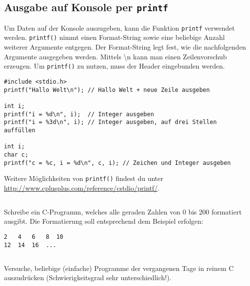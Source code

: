 \subsection{Ausgabe auf Konsole per \lstinline{printf}}

Um Daten auf der Konsole auszugeben, kann die Funktion \lstinline{printf} verwendet werden.
\lstinline{printf()} nimmt einen Format-String sowie eine beliebige Anzahl weiterer Argumente entgegen.
Der Format-String legt fest, wie die nachfolgenden Argumente ausgegeben werden.
Mittels \textbackslash n kann man einen Zeilenvorschub erzeugen. Um \lstinline{printf()} zu nutzen, muss der Header  eingebunden werden.

\begin{lstlisting}
#include <stdio.h>
printf("Hallo Welt\n"); // Hallo Welt + neue Zeile ausgeben

int i;
printf("i = %d\n", i);  // Integer ausgeben
printf("i = %3d\n", i); // Integer ausgeben, auf drei Stellen auffüllen

int i;
char c;
printf("c = %c, i = %d\n", c, i); // Zeichen und Integer ausgeben
\end{lstlisting}

Weitere Möglichkeiten von \lstinline{printf()} findest du unter \url{http://www.cplusplus.com/reference/cstdio/printf/}.

\subsection{}
Schreibe ein C-Programm, welches alle geraden Zahlen von 0 bis 200 formatiert ausgibt.
Die Formatierung soll entsprechend dem Beispiel erfolgen:

\begin{lstlisting}
2   4   6   8  10
12  14  16  ...
\end{lstlisting}

\subsection{}
Versuche, beliebige (einfache) Programme der vergangenen Tage in reinem C auszudrücken (Schwierigkeitsgrad sehr unterschiedlich!).
